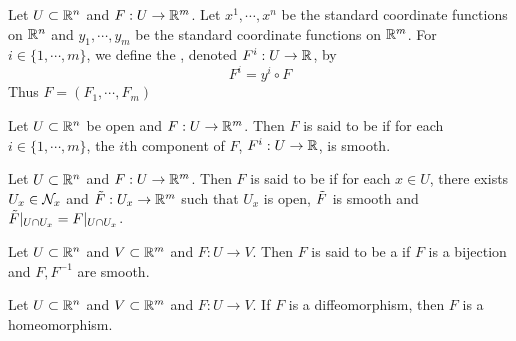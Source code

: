 \documentclass{book}
\begin{document}

	\begin{defn} 
	Let $U \subset \mathbb{R}^n$ and $F: U \rightarrow \mathbb{R}^m$. Let $x^1, \cdots, x^n$ be the standard coordinate functions on $\mathbb{R}^n$ and $y_1, \cdots, y_m$ be the standard coordinate functions on $\mathbb{R}^m$. For $i \in \{1, \cdots, m\}$, we define the , denoted $F^i: U \rightarrow \mathbb{R}$, by $$F^i = y^i \circ F$$ 
	Thus $F = (F_1, \cdots, F_m)$
	\end{defn}
	
	\begin{defn} 
	Let $U \subset \mathbb{R}^n$ be open and $F: U \rightarrow \mathbb{R}^m$. Then $F$ is said to be  if for each $i \in \{1, \cdots, m\}$, the $i$th component of $F$, $F^i: U \rightarrow \mathbb{R}$, is smooth.
	\end{defn}

	\begin{defn} 
		Let $U \subset \mathbb{R}^n$ and $F: U \rightarrow \mathbb{R}^m$. Then $F$ is said to be  if for each $x \in U$, there exists $U_x \in \mathcal{N}_x$ and $\tilde{F} : U_x \rightarrow \mathbb{R}^m$ such that $U_x$ is open, $\tilde{F}$ is smooth and $\tilde{F}|_{U \cap U_x} = F|_{U \cap U_x}$.
	\end{defn}

	\begin{defn} 
		Let $U \subset \mathbb{R}^n$ and $V \subset \mathbb{R}^m$ and $F: U \rightarrow V$. Then $F$ is said to be a   if $F$ is a bijection and $F, F^{-1}$ are smooth. 
	\end{defn}
	
	\begin{ex} 
	Let $U \subset \mathbb{R}^n$ and $V \subset \mathbb{R}^m$ and $F: U \rightarrow V$. If $F$ is a diffeomorphism, then $F$ is a homeomorphism.
	\end{ex}
	
\end{document}
